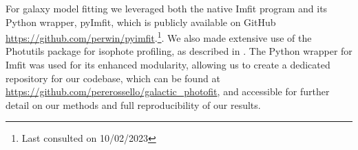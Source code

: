 For galaxy model fitting we leveraged both the native Imfit program and its Python wrapper, pyImfit, which is publicly available on GitHub \url{https://github.com/perwin/pyimfit}.\footnote{Last consulted on 10/02/2023}. We also made extensive use of the Photutils package for isophote profiling, as described in \citep{jedrzejewski1987ccd}. The Python wrapper for Imfit was used for its enhanced modularity, allowing us to create a dedicated repository for our codebase, which can be found at \url{https://github.com/pererossello/galactic_photofit}, and accessible for further detail on our methods and full reproducibility of our results.

